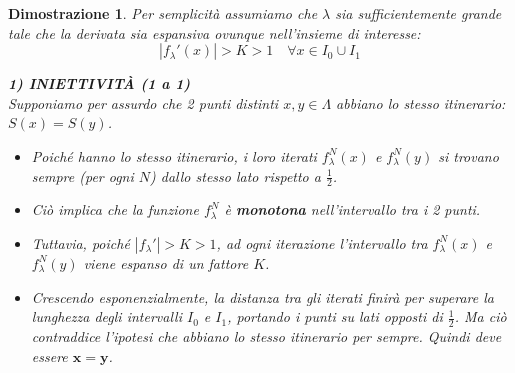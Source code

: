 \documentclass[openany]{book}
\newtheorem*{dimostrazione}{Dimostrazione}
\theoremstyle{definition}
\theoremstyle{remark}
\begin{document}
\begin{dimostrazione}
Per semplicità assumiamo che $\lambda$ sia sufficientemente grande tale che la derivata sia espansiva ovunque nell'insieme di interesse:
$$ |f_\lambda'(x)| > K > 1 \quad \forall x \in I_0 \cup I_1 $$

\textbf{1) INIETTIVITÀ (1 a 1)} \\
Supponiamo per assurdo che 2 punti distinti $x, y \in \Lambda$ abbiano lo stesso itinerario: $S(x) = S(y)$.
\begin{itemize}
    \item Poiché hanno lo stesso itinerario, i loro iterati $f_\lambda^N(x)$ e $f_\lambda^N(y)$ si trovano sempre (per ogni $N$) dallo stesso lato rispetto a $\frac{1}{2}$.
    
    \begin{center}
    \end{center}
    
    \item Ciò implica che la funzione $f_\lambda^N$ è \textbf{monotona} nell'intervallo tra i 2 punti.
    \item Tuttavia, poiché $|f_\lambda'| > K > 1$, ad ogni iterazione l'intervallo tra $f_\lambda^N(x)$ e $f_\lambda^N(y)$ viene espanso di un fattore $K$.
    \item Crescendo esponenzialmente, la distanza tra gli iterati finirà per superare la lunghezza degli intervalli $I_0$ e $I_1$, portando i punti su lati opposti di $\frac{1}{2}$. Ma ciò contraddice l'ipotesi che abbiano lo stesso itinerario per sempre. Quindi deve essere $\mathbf{x = y}$.
\end{itemize}


\end{dimostrazione}
\end{document}
